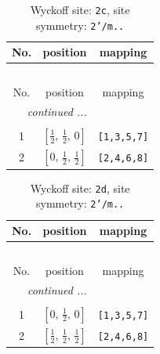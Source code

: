 \documentclass[fleqn,8pt]{jsarticle}
\begin{document}
\begin{longtable}{ccc}
\caption{Wyckoff site: {\tt 2c}, site symmetry: {\tt 2'/m..}}
 \\
 \hline \hline
No. & position & mapping \\ \hline \endfirsthead

\multicolumn{2}{l}{\tablename\ \thetable{}} \\
 \hline \hline
No. & position & mapping \\ \hline \endhead

 \hline \hline
\multicolumn{2}{r}{\footnotesize\it continued ...} \\ \endfoot

 \hline \hline
\multicolumn{2}{r}{} \\ \endlastfoot

1 & $\left[ \frac{1}{2},\, \frac{1}{2},\, 0 \right]$ & {\tt [1,3,5,7]} \\ \hline
2 & $\left[ 0,\, \frac{1}{2},\, \frac{1}{2} \right]$ & {\tt [2,4,6,8]} \\
\end{longtable}
\renewcommand{\arraystretch}{1.2}
\begin{longtable}{ccc}
\caption{Wyckoff site: {\tt 2d}, site symmetry: {\tt 2'/m..}}
 \\
 \hline \hline
No. & position & mapping \\ \hline \endfirsthead

\multicolumn{2}{l}{\tablename\ \thetable{}} \\
 \hline \hline
No. & position & mapping \\ \hline \endhead

 \hline \hline
\multicolumn{2}{r}{\footnotesize\it continued ...} \\ \endfoot

 \hline \hline
\multicolumn{2}{r}{} \\ \endlastfoot

1 & $\left[ 0,\, \frac{1}{2},\, 0 \right]$ & {\tt [1,3,5,7]} \\ \hline
2 & $\left[ \frac{1}{2},\, \frac{1}{2},\, \frac{1}{2} \right]$ & {\tt [2,4,6,8]} \\
\end{longtable}
\renewcommand{\arraystretch}{1.2}
\end{document}
